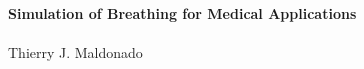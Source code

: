 
\begin{titlepage}
\thispagestyle{plain}

\vspace*{8.15mm}


\headingrule 
\begin{center}
\Large \textbf{Simulation of Breathing for Medical Applications} \ \\ \ \\
\large {Thierry J. Maldonado}\\
\end{center}
\headingrule \ \\ \ \\


\end{titlepage}
